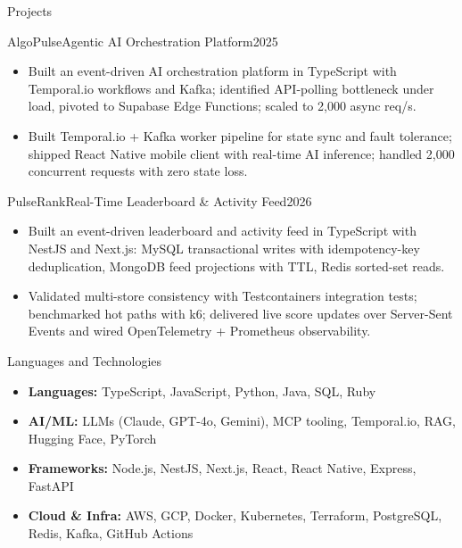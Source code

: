 \documentclass[]{mcdowellcv}
\begin{document}
\begin{cvsection}{Projects}
  \begin{cvsubsection}{AlgoPulse}{Agentic AI Orchestration Platform}{2025}
    \begin{itemize}
      \item Built an event-driven AI orchestration platform in TypeScript with Temporal.io workflows and Kafka; identified API-polling bottleneck under load, pivoted to Supabase Edge Functions; scaled to 2,000 async req/s.
      \item Built Temporal.io + Kafka worker pipeline for state sync and fault tolerance; shipped React Native mobile client with real-time AI inference; handled 2,000 concurrent requests with zero state loss.
    \end{itemize}
    \vspace{-1.5pt}
  \end{cvsubsection}

  \begin{cvsubsection}{PulseRank}{Real-Time Leaderboard \& Activity Feed}{2026}
    \begin{itemize}
      \item Built an event-driven leaderboard and activity feed in TypeScript with NestJS and Next.js: MySQL transactional writes with idempotency-key deduplication, MongoDB feed projections with TTL, Redis sorted-set reads.
      \item Validated multi-store consistency with Testcontainers integration tests; benchmarked hot paths with k6; delivered live score updates over Server-Sent Events and wired OpenTelemetry + Prometheus observability.
    \end{itemize}
    \vspace{-1.5pt}
  \end{cvsubsection}
\end{cvsection}

\begin{cvsection}{Languages and Technologies}
  \begin{cvsubsection}{}{}{}
    \begin{itemize}
      \item \textbf{Languages:} TypeScript, JavaScript, Python, Java, SQL, Ruby
      \item \textbf{AI/ML:} LLMs (Claude, GPT-4o, Gemini), MCP tooling, Temporal.io, RAG, Hugging Face, PyTorch
      \item \textbf{Frameworks:} Node.js, NestJS, Next.js, React, React Native, Express, FastAPI
      \item \textbf{Cloud \& Infra:} AWS, GCP, Docker, Kubernetes, Terraform, PostgreSQL, Redis, Kafka, GitHub Actions
    \end{itemize}
  \end{cvsubsection}
\end{cvsection}
\end{document}
